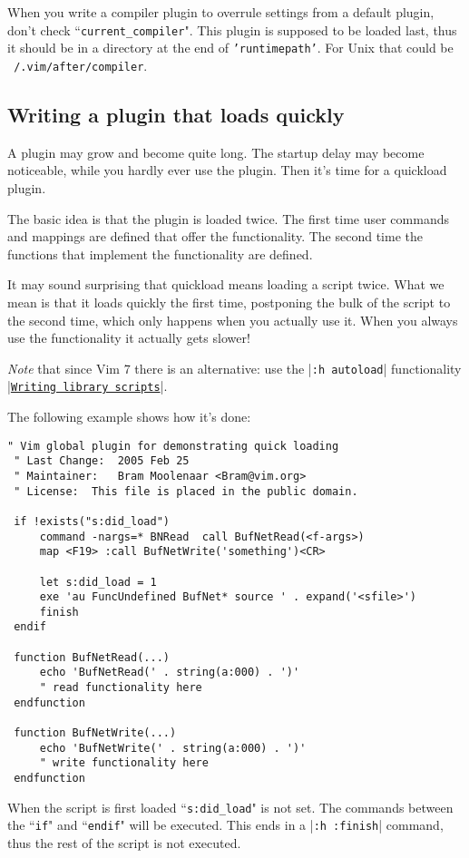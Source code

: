 When you write a compiler plugin to overrule settings from a default plugin, don't check ``\texttt{current\_compiler}".
This plugin is supposed to be loaded last, thus it should be in a directory at the end of \texttt{'runtimepath'}.
For Unix that could be \texttt{~/.vim/after/compiler}.
\subsection{Writing a plugin that loads quickly}
\label{write-plugin-quickload}
A plugin may grow and become quite long.
The startup delay may become noticeable, while you hardly ever use the plugin.
Then it's time for a quickload plugin.

The basic idea is that the plugin is loaded twice.
The first time user commands and mappings are defined that offer the functionality.
The second time the functions that implement the functionality are defined.

It may sound surprising that quickload means loading a script twice.
What we mean is that it loads quickly the first time, postponing the bulk of the script to the second time, which only happens when you actually use it.
When you always use the functionality it actually gets slower!

\emph{Note} that since Vim 7 there is an alternative: use the |\texttt{:h autoload}| functionality |\hyperref[Writing library scripts]{\texttt{Writing library scripts}}|.

The following example shows how it's done:

\begin{Verbatim}[samepage=true]
 " Vim global plugin for demonstrating quick loading
 " Last Change:  2005 Feb 25
 " Maintainer:   Bram Moolenaar <Bram@vim.org>
 " License:  This file is placed in the public domain.

 if !exists("s:did_load")
     command -nargs=* BNRead  call BufNetRead(<f-args>)
     map <F19> :call BufNetWrite('something')<CR>

     let s:did_load = 1
     exe 'au FuncUndefined BufNet* source ' . expand('<sfile>')
     finish
 endif

 function BufNetRead(...)
     echo 'BufNetRead(' . string(a:000) . ')'
     " read functionality here
 endfunction

 function BufNetWrite(...)
     echo 'BufNetWrite(' . string(a:000) . ')'
     " write functionality here
 endfunction
\end{Verbatim}

When the script is first loaded ``\texttt{s:did\_load}" is not set.
The commands between the ``\texttt{if}" and ``\texttt{endif}" will be executed.
This ends in a |\texttt{:h :finish}| command, thus the rest of the script is not executed.

